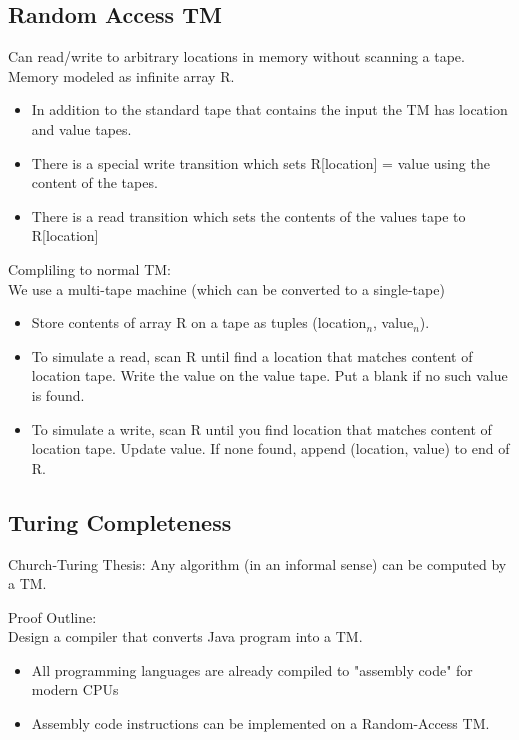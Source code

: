 \subsection*{Random Access TM}
Can read/write to arbitrary locations in memory without scanning a tape. Memory modeled as infinite array R.
\begin{itemize}
  \item In addition to the standard tape that contains the input the TM has location and value tapes.
  \item There is a special write transition which sets R[location] = value using the content of the tapes.
  \item There is a read transition which sets the contents of the values tape to R[location]
\end{itemize}
Compliling to normal TM:
\\
We use a multi-tape machine (which can be converted to a single-tape)
\begin{itemize}
  \item Store contents of array R on a tape as tuples (location$_n$, value$_n$).
  \item To simulate a read, scan R until find a location that matches content of location tape. Write the value on the value tape. Put a blank if no such value is found.
  \item To simulate a write, scan R until you find location that matches content of location tape. Update value. If none found, append (location, value) to end of R.
\end{itemize}
\subsection*{Turing Completeness}
\begin{theorem}
  Church-Turing Thesis: Any algorithm (in an informal sense) can be computed by a TM.
\end{theorem}
Proof Outline:
\\
Design a compiler that converts Java program into a TM.
\begin{itemize}
  \item All programming languages are already compiled to "assembly code" for modern CPUs
  \item Assembly code instructions can be implemented on a Random-Access TM.
\end{itemize}

